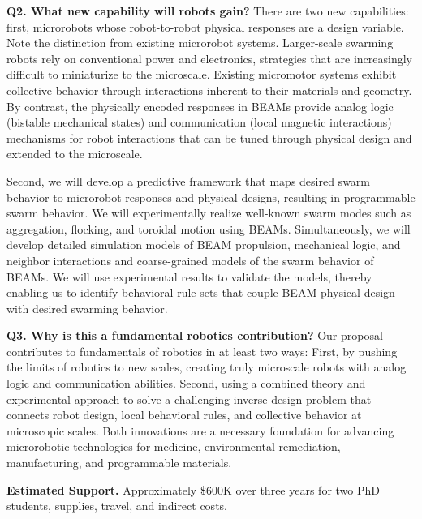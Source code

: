\documentclass[11pt]{article}
\begin{document}
\textbf{Q2. What new capability will robots gain?}
There are two new capabilities: first, microrobots whose robot-to-robot physical responses are a design variable.
Note the distinction from existing microrobot systems.
Larger-scale swarming robots rely on conventional power and electronics, strategies that are increasingly difficult to miniaturize to the microscale.
Existing micromotor systems exhibit collective behavior through interactions inherent to their materials and geometry.
By contrast, the physically encoded responses in BEAMs provide analog logic (bistable mechanical states) and communication (local magnetic interactions) mechanisms for robot interactions that can be tuned through physical design and extended to the microscale.

Second, we will develop a predictive framework that maps desired swarm behavior to microrobot responses and physical designs, resulting in programmable swarm behavior.
We will experimentally realize well-known swarm modes such as aggregation, flocking, and toroidal motion using BEAMs.
Simultaneously, we will develop detailed simulation models of BEAM propulsion, mechanical logic, and neighbor interactions and coarse-grained models of the swarm behavior of BEAMs.
We will use experimental results to validate the models, thereby enabling us to identify behavioral rule-sets that couple BEAM physical design with desired swarming behavior.

\textbf{Q3. Why is this a fundamental robotics contribution?}
Our proposal contributes to fundamentals of robotics in at least two ways:
First, by pushing the limits of robotics to new scales, creating truly microscale robots with analog logic and communication abilities.
Second, using a combined theory and experimental approach to solve a challenging inverse-design problem that connects robot design, local behavioral rules, and collective behavior at microscopic scales.
Both innovations are a necessary foundation for advancing microrobotic technologies for medicine, environmental remediation, manufacturing, and programmable materials.

\textbf{Estimated Support.} 
Approximately \$600K over three years for two PhD students, supplies, travel, and indirect costs.
\end{document}
